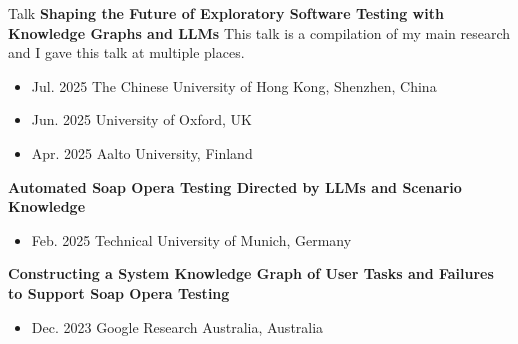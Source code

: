 \documentclass[
	11pt, %
]{resume} %
\begin{document}
\begin{rSection}{Talk}
\textbf{Shaping the Future of Exploratory Software Testing with Knowledge Graphs and LLMs}
\newline
This talk is a compilation of my main research and I gave this talk at multiple places.
\begin{itemize}
    \item Jul. 2025 The Chinese University of Hong Kong, Shenzhen, China
    \item Jun. 2025 University of Oxford, UK
    \item Apr. 2025 Aalto University, Finland
\end{itemize}
\textbf{Automated Soap Opera Testing Directed by LLMs and Scenario Knowledge}
\begin{itemize}
    \item Feb. 2025 Technical University of Munich, Germany
\end{itemize}
\textbf{Constructing a System Knowledge Graph of User Tasks and Failures to Support Soap Opera Testing}
\begin{itemize}
    \item Dec. 2023 Google Research Australia, Australia
\end{itemize}


\end{rSection}
\end{document}

